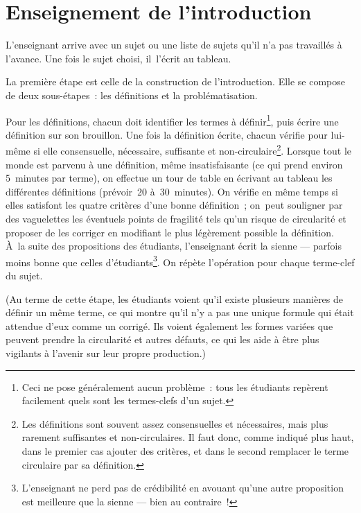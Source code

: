 \documentclass[a4paper,12pt]{report}
\begin{document}
\chapter{Enseignement de l'introduction}
\label{sec:org30d6ce5}

L'enseignant arrive avec un sujet ou une liste de sujets qu'il n'a pas
travaillés à l'avance. Une fois le sujet choisi, il l'écrit au tableau.

La première étape est celle de la construction de l'introduction. Elle
se compose de deux sous-étapes : les définitions et la problématisation.

Pour les définitions, chacun doit identifier les termes à définir\footnote{Ceci ne pose généralement aucun problème : tous les étudiants
repèrent facilement quels sont les termes-clefs d'un sujet.},
puis écrire une définition sur son brouillon. Une fois la définition
écrite, chacun vérifie pour lui-même si elle consensuelle, nécessaire,
suffisante et non-circulaire\footnote{Les définitions sont souvent assez consensuelles et nécessaires,
mais plus rarement suffisantes et non-circulaires. Il faut donc, comme
indiqué plus haut, dans le premier cas ajouter des critères, et dans le
second remplacer le terme circulaire par sa définition.}. Lorsque tout le monde est parvenu à
une définition, même insatisfaisante (ce qui prend environ 5 minutes par
terme), on effectue un tour de table en écrivant au tableau les
différentes définitions (prévoir 20 à 30 minutes). On vérifie en même
temps si elles satisfont les quatre critères d'une bonne définition ;
on peut souligner par des vaguelettes les éventuels points de fragilité
tels qu'un risque de circularité et proposer de les corriger en
modifiant le plus légèrement possible la définition. À la suite des
propositions des étudiants, l'enseignant écrit la sienne — parfois moins
bonne que celles d'étudiants\footnote{L'enseignant ne perd pas de crédibilité en avouant qu'une autre
proposition est meilleure que la sienne --- bien au contraire !}. On répète l'opération pour chaque
terme-clef du sujet.

(Au terme de cette étape, les étudiants voient qu'il existe plusieurs
manières de définir un même terme, ce qui montre qu'il n'y a pas une
unique formule qui était attendue d'eux comme un corrigé. Ils voient
également les formes variées que peuvent prendre la circularité et
autres défauts, ce qui les aide à être plus vigilants à l'avenir sur
leur propre production.)
\end{document}

